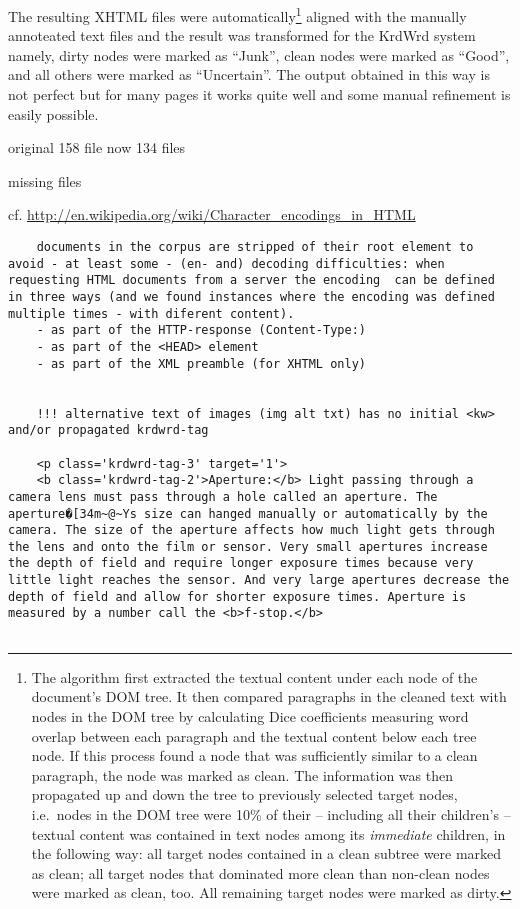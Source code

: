 \begin{longversion}
    The resulting XHTML files were automatically\footnote{The algorithm first extracted the textual content under each node of the document's DOM tree.
    It then compared paragraphs in the cleaned text with nodes in the DOM tree by calculating Dice coefficients measuring word overlap between each paragraph and the textual content below each tree node.
    If this process found a node that was sufficiently similar to a clean paragraph, the node was marked as clean.
    The information was then propagated up and down the tree to previously selected target nodes, i.e.~nodes in the DOM tree were 10\% of their -- including all their children's --  textual content was contained in text nodes among its \emph{immediate} children, in the following way:
    all target nodes contained in a clean subtree were marked as clean;
    all target nodes that dominated more clean than non-clean nodes were marked as clean, too.
    All remaining target nodes were marked as dirty.} aligned with the manually annoteated text files and the result was transformed for the KrdWrd system namely,
    dirty nodes were marked as ``Junk'', clean nodes were marked as ``Good'', and all others were marked as ``Uncertain''.
    The output obtained in this way is not perfect but for many pages it works quite well and some manual refinement is easily possible.


    original 158 file
    now 134 files

    missing files


    cf. \url{http://en.wikipedia.org/wiki/Character_encodings_in_HTML}
    \begin{verbatim}
    documents in the corpus are stripped of their root element to avoid - at least some - (en- and) decoding difficulties: when requesting HTML documents from a server the encoding  can be defined in three ways (and we found instances where the encoding was defined multiple times - with diferent content). 
    - as part of the HTTP-response (Content-Type:)
    - as part of the <HEAD> element
    - as part of the XML preamble (for XHTML only)


    !!! alternative text of images (img alt txt) has no initial <kw> and/or propagated krdwrd-tag

    <p class='krdwrd-tag-3' target='1'>
    <b class='krdwrd-tag-2'>Aperture:</b> Light passing through a camera lens must pass through a hole called an aperture. The aperture�[34m~@~Ys size can hanged manually or automatically by the camera. The size of the aperture affects how much light gets through the lens and onto the film or sensor. Very small apertures increase the depth of field and require longer exposure times because very little light reaches the sensor. And very large apertures decrease the depth of field and allow for shorter exposure times. Aperture is measured by a number call the <b>f-stop.</b>


\end{verbatim}
\end{longversion}

